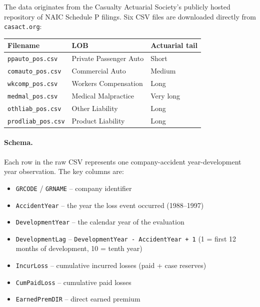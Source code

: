 
The data originates from the Casualty Actuarial Society's publicly hosted
repository of NAIC Schedule P filings.  Six CSV files are downloaded directly
from \texttt{casact.org}:

\begin{center}
\begin{tabular}{lll}
\toprule
\textbf{Filename} & \textbf{LOB} & \textbf{Actuarial tail} \\
\midrule
\texttt{ppauto\_pos.csv}   & Private Passenger Auto  & Short \\
\texttt{comauto\_pos.csv}  & Commercial Auto         & Medium \\
\texttt{wkcomp\_pos.csv}   & Workers Compensation    & Long \\
\texttt{medmal\_pos.csv}   & Medical Malpractice     & Very long \\
\texttt{othliab\_pos.csv}  & Other Liability         & Long \\
\texttt{prodliab\_pos.csv} & Product Liability       & Long \\
\bottomrule
\end{tabular}
\end{center}

\paragraph{Schema.}
Each row in the raw CSV represents one company-accident year-development year
observation.  The key columns are:

\begin{itemize}
  \item \texttt{GRCODE} / \texttt{GRNAME} -- company identifier
  \item \texttt{AccidentYear} -- the year the loss event occurred (1988--1997)
  \item \texttt{DevelopmentYear} -- the calendar year of the evaluation
  \item \texttt{DevelopmentLag} -- \texttt{DevelopmentYear - AccidentYear + 1}
    (1 = first 12 months of development, 10 = tenth year)
  \item \texttt{IncurLoss} -- cumulative incurred losses (paid + case reserves)
  \item \texttt{CumPaidLoss} -- cumulative paid losses
  \item \texttt{EarnedPremDIR} -- direct earned premium
\end{itemize}

